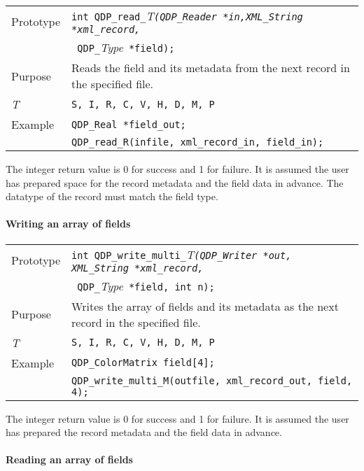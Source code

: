 \documentclass{article}
\newcommand{\allTypes}{{\tt S, I, R, C, V, H, D, M, P}}
\newcommand{\itt}{\it T}
\newcommand{\QMDhandle}{{\tt XML\_String}}
\begin{document}
\begin{flushleft}
  \begin{tabular}{|l|l|}
  \hline
  Prototype      & \verb|int QDP_read_|\itt\verb|(QDP_Reader *in,|\QMDhandle \verb| *xml_record,|\\
                 & \verb| QDP_|{\it Type}\verb| *field);|\\
    \hline
  Purpose        & Reads the field and its metadata from the next record in the specified file. \\
\hline
  \itt     & \allTypes \\
   \hline
  Example  & \verb|QDP_Real *field_out;| \\
           & \verb|QDP_read_R(infile, xml_record_in, field_in);| \\
   \hline
 \end{tabular}
\end{flushleft}
%
The integer return value is 0 for success and 1 for failure.  It is
assumed the user has prepared space for the record metadata and the
field data in advance.  The datatype of the record must match the
field type.

\paragraph{Writing an array of fields}

\begin{flushleft}
  \begin{tabular}{|l|l|}
  \hline
  Prototype      & \verb|int QDP_write_multi_|\itt\verb|(QDP_Writer *out, |\QMDhandle\verb| *xml_record,|\\
                 & \verb| QDP_|{\it Type}\verb| *field, int n);|\\
    \hline
  Purpose        & Writes the array of fields and its metadata as the next record in the specified file. \\
\hline
  \itt     & \allTypes \\
   \hline
  Example  & \verb|QDP_ColorMatrix field[4];| \\
           & \verb|QDP_write_multi_M(outfile, xml_record_out, field, 4);| \\
   \hline
 \end{tabular}
\end{flushleft}
%
The integer return value is 0 for success and 1 for failure.  It is
assumed the user has prepared the record metadata and the field data
in advance.

\paragraph{Reading an array of fields}
\end{document}
